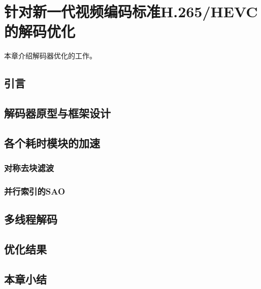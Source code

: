 \chapter{针对新一代视频编码标准H.265/HEVC的解码优化}
本章介绍解码器优化的工作。

\section{引言}

\section{解码器原型与框架设计}

\section{各个耗时模块的加速}

\subsection{对称去块滤波}

\subsection{并行索引的SAO}

\section{多线程解码}

\section{优化结果}

\section{本章小结}
